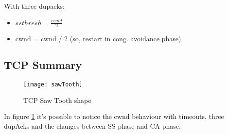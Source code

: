 With three dupacks:

\begin{itemize}
  \item $ssthresh = \frac{cwnd}{2}$
  \item cwnd = cwnd / 2 (so, restart in cong. avoidance phase)
\end{itemize}

\subsection{TCP Summary}

\begin{figure}[H]
  \texttt{[image: sawTooth]}
  \caption{TCP Saw Tooth shape}
  \label{img:sawTooth}
\end{figure}

In figure \ref{img:sawTooth} it's possible to notice the cwnd behaviour with
timeouts, three dupAcks and the changes between SS phase and CA phase.
